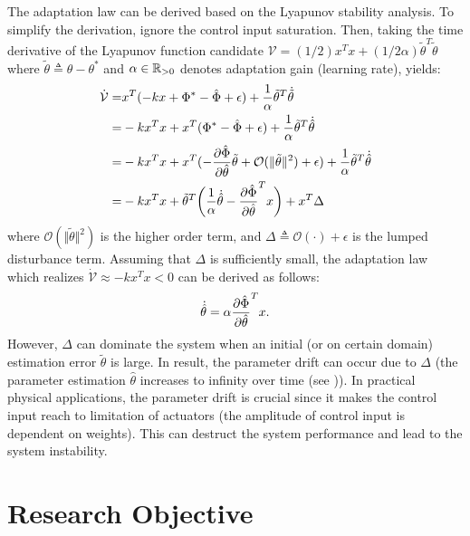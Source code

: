 The adaptation law can be derived based on the Lyapunov stability analysis.
To simplify the derivation, ignore the control input saturation.
Then, taking the time derivative of the Lyapunov function candidate $\mathcal V = (1/2)x^Tx+(1/2\alpha)\tilde\theta^T\tilde\theta$ where $\tilde\theta\triangleq \hat\theta-\theta^*$ and $\alpha\in\mathbb{R}_{>0}$ denotes adaptation gain (learning rate), yields:
\begin{equation}
    \begin{aligned}
        \dot{\mathcal V}
        =& x^T ( - kx + \Phi^* - \hat\Phi + \epsilon ) + {1\over\alpha}\tilde\theta^T \dot{\tilde\theta}
        \\
        =& - k x^Tx + x^T(\Phi^* - \hat\Phi + \epsilon) + {1\over\alpha}\tilde\theta^T \dot{\hat\theta}
        \\
        =& - k x^Tx + x^T( -{\partial \hat\Phi\over\partial \hat\theta}\tilde\theta + \mathcal O(\Vert\tilde\theta\Vert^2) +\epsilon) + {1\over\alpha}\tilde\theta^T \dot{\hat\theta}
        \\
        =& - k x^Tx +\tilde\theta^T
        \bigg(
            {1\over \alpha} \dot{\hat\theta} - {\partial \hat\Phi\over\partial \hat\theta}^T x
        \bigg)
        + x^T\Delta
    \end{aligned}
\end{equation}
where $\mathcal O (\Vert\tilde\theta\Vert^2)$ is the higher order term, and $\Delta\triangleq \mathcal O(\cdot)+\epsilon$ is the lumped disturbance term.
Assuming that $\Delta$ is sufficiently small, the adaptation law which realizes $\dot{\mathcal V}\approx -kx^Tx<0$ can be derived as follows:
\begin{equation}
    \dot{\hat\theta} = \alpha {\partial \hat\Phi\over\partial \hat\theta}^T x
    .
\end{equation}
However, $\Delta$ can dominate the system when an initial (or on certain domain) estimation error $\tilde\theta$ is large.
In result, the parameter drift can occur due to $\Delta$ (\ie the parameter estimation $\hat\theta$ increases to infinity over time (see \cite{RN6})).
In practical physical applications, the parameter drift is crucial since it makes the control input reach to limitation of actuators (\ie the amplitude of control input is dependent on weights).
This can destruct the system performance and lead to the system instability.

\section{Research Objective} \label{chap1:sec:research objective}

